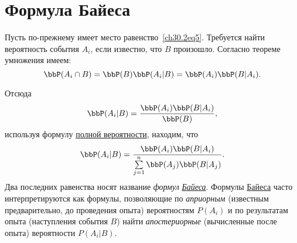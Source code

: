\section{Формула Байеса}
Пусть по-прежнему имеет место равенство~\eqref{ch30.2eq5}. Требуется найти вероятность события $A_i$, если известно, что $B$ произошло. Согласно теореме умножения имеем:
$$
\bbP(A_i\cap B) = \bbP(B)\bbP(A_i|B) = \bbP(A_i)\bbP(B|A_i).
$$

Отсюда
$$
\bbP(A_i|B) = \frac{\bbP(A_i)\bbP(B|A_i)}{\bbP(B)},
$$
используя формулу \hyperref[fullprob]{полной вероятности}, находим, что
\begin{equation}\label{Bayes}
\bbP(A_i|B) = \frac{\bbP(A_i)\bbP(B|A_i)}{\sum\limits_{j = 1}^{n} \bbP(A_j)\bbP(B|A_j)}.
\end{equation}
Два последних равенства носят название \textit{формул} \hyperref[Bayes]{\textit{Байеса}}. Формулы \hyperref[Bayes]{Байеса} часто интерпретируются как формулы, позволяющие по \textit{априорным} (известным предварительно, до проведения опыта) вероятностям $P(A_i)$ и по результатам опыта (наступления события $B$) найти \textit{апостериорные} (вычисленные после опыта) вероятности $P(A_i|B)$.
